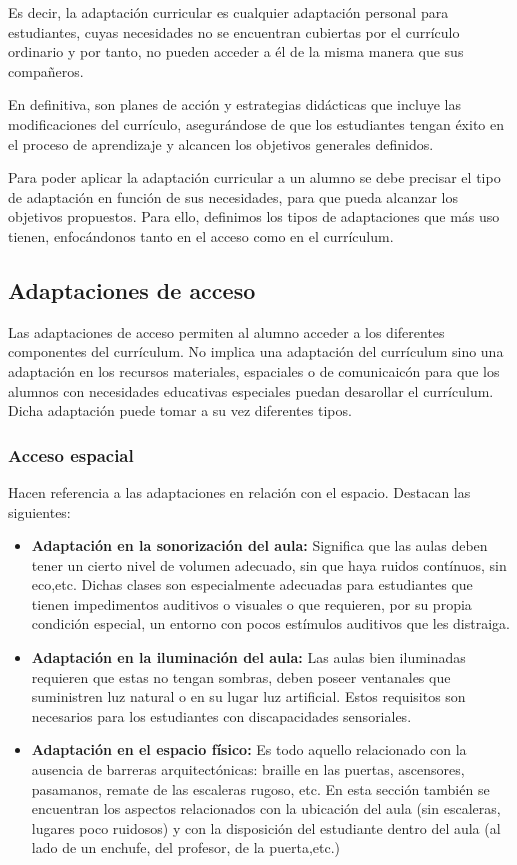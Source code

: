 Es decir, la adaptación curricular es cualquier adaptación personal para estudiantes, cuyas necesidades no se encuentran cubiertas por el currículo ordinario y por tanto, no pueden acceder a él de la misma manera que sus compañeros.

En definitiva, son planes de acción y estrategias didácticas que incluye las modificaciones del currículo, asegurándose de que los estudiantes tengan éxito en el proceso de aprendizaje y alcancen los objetivos generales definidos.

Para poder aplicar la adaptación curricular a un alumno se debe precisar el tipo de adaptación en función de sus necesidades, para que pueda alcanzar los objetivos propuestos. Para ello, definimos los tipos de adaptaciones que más uso tienen, enfocándonos tanto en el acceso como en el currículum.

\subsection{Adaptaciones de acceso}
Las adaptaciones de acceso permiten al alumno acceder a los diferentes componentes del currículum. No implica una adaptación del currículum sino una adaptación en los recursos materiales, espaciales o de comunicaicón para que los alumnos con necesidades educativas especiales puedan desarollar el currículum.
Dicha adaptación puede tomar a su vez diferentes tipos.

\subsubsection{Acceso espacial}
Hacen referencia a las adaptaciones en relación con el espacio. Destacan las siguientes:
\begin{itemize}
    \item \textbf{Adaptación en la sonorización del aula:} Significa que las aulas deben tener un cierto nivel de volumen adecuado, sin que haya ruidos contínuos, sin eco,etc. Dichas clases son especialmente adecuadas para estudiantes que tienen impedimentos auditivos o visuales o que requieren, por su propia condición especial, un entorno con pocos estímulos auditivos que les distraiga.
    \item \textbf{Adaptación en la iluminación del aula:} Las aulas bien iluminadas requieren que estas no tengan sombras, deben poseer ventanales que suministren luz natural o en su lugar luz artificial. Estos requisitos son necesarios para los estudiantes con discapacidades sensoriales.
    \item \textbf{Adaptación en el espacio físico:} Es todo aquello relacionado con la ausencia de barreras arquitectónicas:  braille en las puertas, ascensores, pasamanos, remate de las escaleras rugoso, etc. En esta sección también se encuentran los aspectos relacionados con la ubicación del aula (sin escaleras, lugares poco ruidosos) y con la disposición del estudiante dentro del aula (al lado de un enchufe, del profesor, de la puerta,etc.)
\end{itemize}


